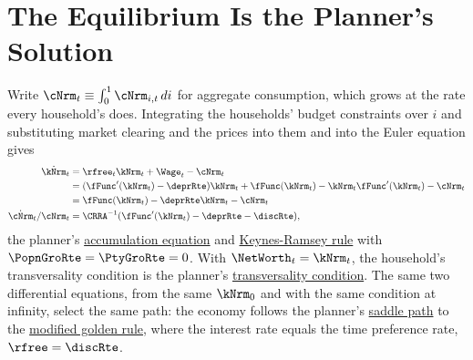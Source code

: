 \documentclass{econark}
\begin{document}
\section{The Equilibrium Is the Planner's Solution}

Write $\cNrm_{t} \equiv \int_{0}^{1}\cNrm_{i,t}\,di$ for aggregate consumption, which grows at the rate every household's does. Integrating the households' budget constraints over $i$ and substituting market clearing and the prices into them and into the Euler equation gives
\begin{equation}\begin{gathered}\begin{aligned}
  \dot{\kNrm}_{t} & =  \rfree_{t}\kNrm_{t} + \Wage_{t} - \cNrm_{t}
\\ & = (\fFunc^{\prime}(\kNrm_{t})-\deprRte)\kNrm_{t} + \fFunc(\kNrm_{t}) - \kNrm_{t}\fFunc^{\prime}(\kNrm_{t}) - \cNrm_{t}
\\ & = \fFunc(\kNrm_{t}) - \deprRte\kNrm_{t} - \cNrm_{t}
\\ \dot{\cNrm}_{t}/\cNrm_{t} & = \CRRA^{-1}(\fFunc^{\prime}(\kNrm_{t})-\deprRte-\discRte),
\end{aligned}\end{gathered}\label{eq:DecRCK-aggkdot}\end{equation}
the planner's \href{https://intertemporal-choice.github.io/content/growth/ramseycasskoopmans/\#eq-rck-kdot}{accumulation equation} and \href{https://intertemporal-choice.github.io/content/growth/ramseycasskoopmans/\#eq-cdotoc}{Keynes-Ramsey rule} with $\PopnGroRte=\PtyGroRte=0$. With $\NetWorth_{t}=\kNrm_{t}$, the household's transversality condition is the planner's \href{https://intertemporal-choice.github.io/content/growth/ramseycasskoopmans/\#eq-tvc}{transversality condition}. The same two differential equations, from the same $\kNrm_{0}$ and with the same condition at infinity, select the same path: the economy follows the planner's \href{https://intertemporal-choice.github.io/content/growth/ramseycasskoopmans/\#fig-ramseysaddleplot}{saddle path} to the \href{https://intertemporal-choice.github.io/content/growth/ramseycasskoopmans/\#eq-rck-modgoldenrule}{modified golden rule}, where the interest rate equals the time preference rate, $\rfree = \discRte$.
\end{document}
